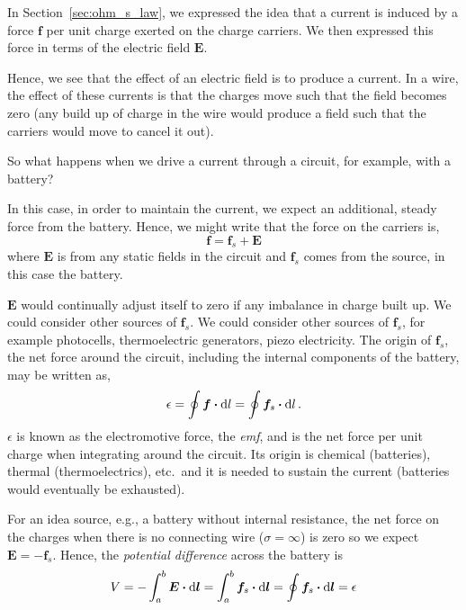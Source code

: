 \documentclass[12pt,chapterprefix=false,dvipsnames]{scrbook}
\theoremstyle{dotless}
\theoremstyle{definition}
\begin{document}
In Section~\ref{sec:ohm_s_law}, we expressed the idea that
a current is induced by a force $\bm{f}$ per unit
charge exerted on the charge carriers. We then expressed this
force in terms of the electric field $\bm{E}$.

Hence, we see that the effect of an electric field is to produce
a current. In a wire, the effect of these currents is that the
charges move such that the field becomes zero (any build up of
charge in the wire would produce a field such that the carriers
would move to cancel it out).

So what happens when we drive a current through a circuit, for
example, with a battery?

In this case, in order to maintain the current, we expect an
additional, steady force from the battery. Hence, we might write
that the force on the carriers is,
\begin{equation}
	\bm{f} = \bm{f}_s +
	\bm{E}
\end{equation}
where $\bm{E}$ is from any static fields in the
circuit and $\bm{f}_s$ comes from the source, in
this case the battery.

$\bm{E}$ would continually adjust itself to zero
if any imbalance in charge built up. We could consider other
sources of $\bm{f}_s$. We could consider other
sources of $\bm{f}_s$, for example photocells,
thermoelectric generators, piezo electricity. The origin of
$\bm{f}_s$, the net force around the circuit,
including the internal components of the battery, may be written
as,
\begin{equation}
	\epsilon = \oint
	\bm{f}\vdot\dd{l} = \oint
	\bm{f}_s\vdot\dd{l}.
\end{equation}
$\epsilon$ is known as the electromotive force, the
\textit{emf}, and is the net force per unit charge
when integrating around the circuit. Its origin is chemical
(batteries), thermal (thermoelectrics), etc.\ and it is needed
to sustain the current (batteries would eventually be
exhausted).

For an idea source, e.g., a battery without internal resistance,
the net force on the charges when there is no connecting wire
($\sigma = \infty$) is zero so we expect
$\bm{E} = -\bm{f}_s$. Hence, the \textit{potential difference}
across the battery is
\begin{equation}
	V =
	-\int_{a}^{b}\bm{E}\vdot\dd{\bm{l}}
	=
	\int_{a}^{b}\bm{f}_s\vdot\dd{\bm{l}}
	= \oint\bm{f}_{s}\vdot\dd{\bm{l}} =
	\epsilon
\end{equation}
\end{document}
